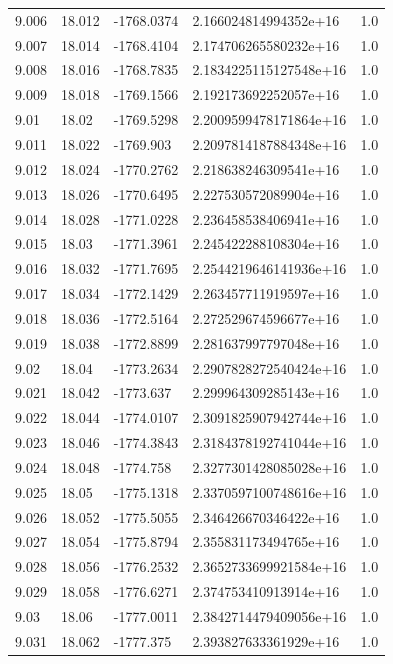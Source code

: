 \begin{tabular}{lllll}
9.006 & 18.012 & -1768.0374 & 2.166024814994352e+16 & 1.0 \\
9.007 & 18.014 & -1768.4104 & 2.174706265580232e+16 & 1.0 \\
9.008 & 18.016 & -1768.7835 & 2.1834225115127548e+16 & 1.0 \\
9.009 & 18.018 & -1769.1566 & 2.192173692252057e+16 & 1.0 \\
9.01 & 18.02 & -1769.5298 & 2.2009599478171864e+16 & 1.0 \\
9.011 & 18.022 & -1769.903 & 2.2097814187884348e+16 & 1.0 \\
9.012 & 18.024 & -1770.2762 & 2.218638246309541e+16 & 1.0 \\
9.013 & 18.026 & -1770.6495 & 2.227530572089904e+16 & 1.0 \\
9.014 & 18.028 & -1771.0228 & 2.236458538406941e+16 & 1.0 \\
9.015 & 18.03 & -1771.3961 & 2.245422288108304e+16 & 1.0 \\
9.016 & 18.032 & -1771.7695 & 2.2544219646141936e+16 & 1.0 \\
9.017 & 18.034 & -1772.1429 & 2.263457711919597e+16 & 1.0 \\
9.018 & 18.036 & -1772.5164 & 2.272529674596677e+16 & 1.0 \\
9.019 & 18.038 & -1772.8899 & 2.281637997797048e+16 & 1.0 \\
9.02 & 18.04 & -1773.2634 & 2.2907828272540424e+16 & 1.0 \\
9.021 & 18.042 & -1773.637 & 2.299964309285143e+16 & 1.0 \\
9.022 & 18.044 & -1774.0107 & 2.3091825907942744e+16 & 1.0 \\
9.023 & 18.046 & -1774.3843 & 2.3184378192741044e+16 & 1.0 \\
9.024 & 18.048 & -1774.758 & 2.3277301428085028e+16 & 1.0 \\
9.025 & 18.05 & -1775.1318 & 2.3370597100748616e+16 & 1.0 \\
9.026 & 18.052 & -1775.5055 & 2.346426670346422e+16 & 1.0 \\
9.027 & 18.054 & -1775.8794 & 2.355831173494765e+16 & 1.0 \\
9.028 & 18.056 & -1776.2532 & 2.3652733699921584e+16 & 1.0 \\
9.029 & 18.058 & -1776.6271 & 2.374753410913914e+16 & 1.0 \\
9.03 & 18.06 & -1777.0011 & 2.3842714479409056e+16 & 1.0 \\
9.031 & 18.062 & -1777.375 & 2.393827633361929e+16 & 1.0 \\

\end{tabular}
